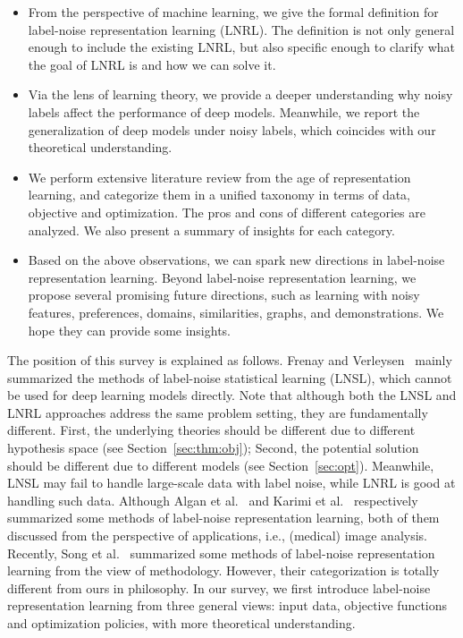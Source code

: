 \begin{itemize}[leftmargin=*]
\item From the perspective of machine learning, we give the formal definition for label-noise representation learning (LNRL). 
The definition is not only general enough to include the existing LNRL, but also specific enough to clarify what the goal of LNRL is and how we can solve it.
\item Via the lens of learning theory, 
we provide a deeper understanding why noisy labels affect the performance of deep models. 
Meanwhile, we report the generalization of deep models under noisy labels, which coincides with our theoretical understanding.
\item We perform extensive literature review from the age of representation learning, 
and categorize them in a unified taxonomy in terms of data, objective and optimization. 
The pros and cons of different categories are analyzed. 
We also present a summary of insights for each category.
\item Based on the above observations, we can spark new directions in label-noise representation learning. Beyond label-noise representation learning, we propose several promising future directions, 
such as learning with noisy features, preferences, domains, similarities, graphs, and demonstrations. We hope they can provide some insights.
\end{itemize}

The position of this survey is explained as follows.
Frenay and Verleysen~ mainly summarized the methods of label-noise statistical learning (LNSL), which cannot be used for deep learning models directly. Note that although both the LNSL and LNRL approaches address the same problem setting, they are fundamentally different. First, the underlying theories should be different due to different hypothesis space (see Section~\ref{sec:thm:obj}); Second, the potential solution should be different due to different models (see Section~\ref{sec:opt}). Meanwhile, LNSL may fail to handle large-scale data with label noise, while LNRL is good at handling such data.
Although Algan et al.~ and Karimi et al.~ respectively summarized some methods of label-noise representation learning, both of them discussed from the perspective of applications, i.e., (medical) image analysis. Recently, Song et al.~ summarized some methods of label-noise representation learning from the view of methodology. However, their categorization is totally different from ours in philosophy. In our survey, we first introduce label-noise representation learning from three general views: input data, objective functions and optimization policies, with more theoretical understanding.

